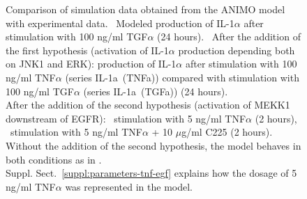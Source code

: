 \begin{figure}[!tpb]
\begin{center}
\end{center}
\caption{\scriptsize
Comparison of simulation data obtained from the ANIMO model with experimental data.
{\bf \protect{}}~Modeled production of IL-1$\alpha$ after stimulation with 100 ng/ml TGF$\alpha$ (24 hours).
{\bf \protect{}}~After the addition of the first hypothesis (activation of IL-1$\alpha$ production depending both
on JNK1 and ERK): production of IL-1$\alpha$ after stimulation with 100 ng/ml TNF$\alpha$ (series {\sf IL-1a~(TNFa)})
compared with stimulation with 100 ng/ml TGF$\alpha$ (series {\sf IL-1a~(TGFa)}) (24 hours).\\
After the addition of the second hypothesis (activation of MEKK1 downstream of EGFR): {\bf \protect{}}~stimulation with 5 ng/ml TNF$\alpha$ (2 hours),
{\bf \protect{}}~stimulation with 5 ng/ml TNF$\alpha$ + 10 $\mu$g/ml C225 (2 hours).
Without the addition of the second hypothesis, the model behaves in both conditions as in {\bf \protect{}}.\\
Suppl. Sect.~\ref{suppl:parameters-tnf-egf} explains how the dosage of 5 ng/ml TNF$\alpha$ was represented in the model.}\label{fig:large-model-graph}
\end{figure}


